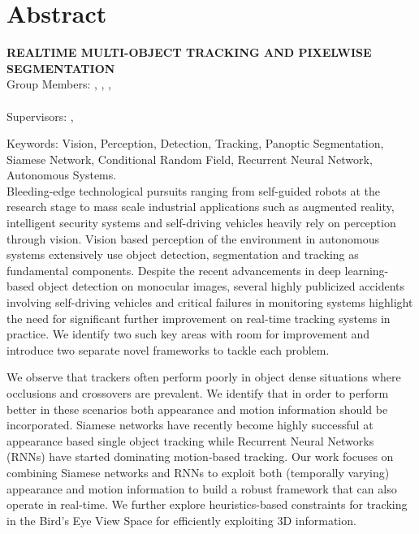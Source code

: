 \chapter*{Abstract}

\begin{center}
	\vspace{5mm}
	\MakeUppercase{\textbf{Realtime Multi-Object Tracking and Pixelwise Segmentation}}\\
	\vspace{5mm}
	Group Members: \memberA, \memberB, \memberC, \\ \memberD \\
	\vspace{5mm}
	Supervisors: \supervisorA, \supervisorB \\
	\vspace{5mm}
\end{center}

\noindent Keywords: Vision, Perception, Detection, Tracking, Panoptic Segmentation, Siamese Network, Conditional Random Field, Recurrent Neural Network, Autonomous Systems. \\

Bleeding-edge technological pursuits ranging from self-guided robots at the research stage to mass scale industrial applications such as augmented reality, intelligent security systems and self-driving vehicles heavily rely on perception through vision. Vision based perception of the environment in autonomous systems extensively use object detection, segmentation and tracking as fundamental components. Despite the recent advancements in deep learning-based object detection on monocular images, several highly publicized accidents involving self-driving vehicles and critical failures in monitoring systems highlight the need for significant further improvement on real-time tracking systems in practice. We identify two such key areas with room for improvement and introduce two separate novel frameworks to tackle each problem. 

We observe that trackers often perform poorly in object dense situations where occlusions and crossovers are prevalent. We identify that in order to perform better in these scenarios both appearance and motion information should be incorporated. Siamese networks have recently become highly successful at appearance based single object tracking while Recurrent Neural Networks (RNNs) have started dominating motion-based tracking. Our work focuses on combining Siamese networks and RNNs to exploit both (temporally varying) appearance and motion information to build a robust framework that can also operate in real-time. We further explore heuristics-based constraints for tracking in the Bird’s Eye View Space for efficiently exploiting 3D information.

